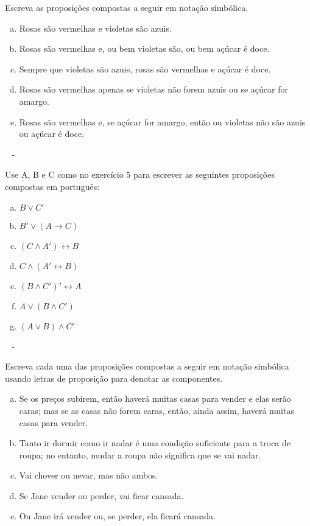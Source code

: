 \documentclass[a4paper, 12pt, addpoints]{exam}
\begin{document}
\begin{questions}
  Escreva as proposições compostas a seguir em notação simbólica.

  \begin{enumerate}[a)]
    \item Rosas são vermelhas e violetas são azuis.
    \item Rosas são vermelhas e, ou bem violetas são, ou bem açúcar é doce.
    \item Sempre que violetas são azuis, rosas são vermelhas e açúcar é doce.
    \item Rosas são vermelhas apenas se violetas não forem azuis ou se açúcar for
          amargo.
    \item Rosas são vermelhas e, se açúcar for amargo, então ou violetas não são azuis
          ou açúcar é doce.
  \end{enumerate}

  \begin{resp}~
    -
  \end{resp}


  \question Use A, B e C como no exercício 5 para escrever as seguintes proposições compostas
  em português:
  \begin{multicols}{2}
    \begin{enumerate}[a)]
      \item $B \vee C'$
      \item $B' \vee (A \rightarrow C)$
      \item $(C \wedge A') \leftrightarrow B$
      \item $C \wedge (A' \leftrightarrow B)$
      \item $(B \wedge C')' \leftrightarrow A$
      \item $A \vee (B \wedge C')$
      \item $(A \vee B) \wedge C'$
    \end{enumerate}
  \end{multicols}

  \begin{resp}~
    -
  \end{resp}

  \question Escreva cada uma das proposições compostas a seguir em notação simbólica usando
  letras de proposição para denotar as componentes.

  \begin{enumerate}[a)]
    \item Se os preços subirem, então haverá muitas casas para vender e elas serão
          caras; mas se as casas não forem caras, então, ainda assim, haverá muitas casas para
          vender.
    \item Tanto ir dormir como ir nadar é uma condição suficiente para a troca de roupa;
          no entanto, mudar a roupa não significa que se vai nadar.
    \item Vai chover ou nevar, mas não ambos.
    \item Se Jane vender ou perder, vai ficar cansada.
    \item Ou Jane irá vender ou, se perder, ela ficará cansada.
  \end{enumerate}


\end{questions}
\end{document}

